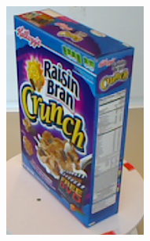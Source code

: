 \begin{figure}
\begin{subfigure}[b]{0.3\textwidth}
		\includegraphics[width=\textwidth]{img/obj_nuevos/cereal_box.png}
	\end{subfigure}


\end{figure}
